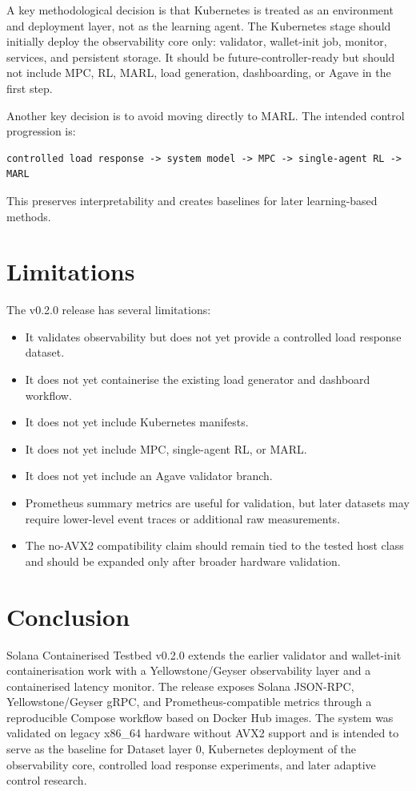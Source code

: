 \documentclass[11pt,a4paper]{article}
\begin{document}
A key methodological decision is that Kubernetes is treated as an environment and deployment layer, not as the learning agent. The Kubernetes stage should initially deploy the observability core only: validator, wallet-init job, monitor, services, and persistent storage. It should be future-controller-ready but should not include MPC, RL, MARL, load generation, dashboarding, or Agave in the first step.

Another key decision is to avoid moving directly to MARL. The intended control progression is:

\begin{lstlisting}
controlled load response -> system model -> MPC -> single-agent RL -> MARL
\end{lstlisting}

This preserves interpretability and creates baselines for later learning-based methods.

\section{Limitations}

The v0.2.0 release has several limitations:

\begin{itemize}[leftmargin=2em]
  \item It validates observability but does not yet provide a controlled load response dataset.
  \item It does not yet containerise the existing load generator and dashboard workflow.
  \item It does not yet include Kubernetes manifests.
  \item It does not yet include MPC, single-agent RL, or MARL.
  \item It does not yet include an Agave validator branch.
  \item Prometheus summary metrics are useful for validation, but later datasets may require lower-level event traces or additional raw measurements.
  \item The no-AVX2 compatibility claim should remain tied to the tested host class and should be expanded only after broader hardware validation.
\end{itemize}

\section{Conclusion}

Solana Containerised Testbed v0.2.0 extends the earlier validator and wallet-init containerisation work with a Yellowstone/Geyser observability layer and a containerised latency monitor. The release exposes Solana JSON-RPC, Yellowstone/Geyser gRPC, and Prometheus-compatible metrics through a reproducible Compose workflow based on Docker Hub images. The system was validated on legacy x86\_64 hardware without AVX2 support and is intended to serve as the baseline for Dataset layer 0, Kubernetes deployment of the observability core, controlled load response experiments, and later adaptive control research.
\end{document}
